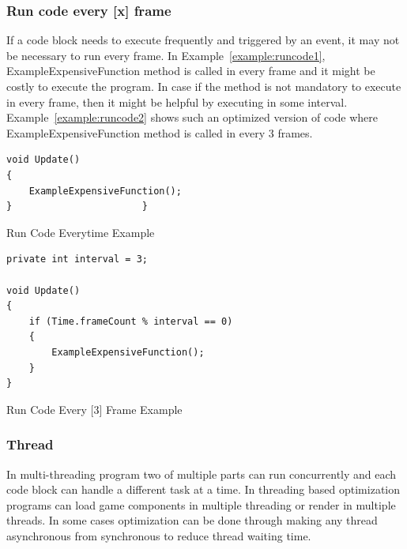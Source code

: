 \subsubsection{Run code every [x] frame}
If a code block needs to execute frequently and triggered by an event, it may not be necessary to run every frame. In Example~\ref{example:runcode1}, ExampleExpensiveFunction method is called in every frame and it might be costly to execute the program. In case if the method is not mandatory to execute in every frame, then it might be helpful by executing in some interval. Example~\ref{example:runcode2} shows such an optimized version of code where ExampleExpensiveFunction method is called in every 3 frames.

\begin{example}
\begin{lstlisting}[escapechar=!]
void Update()
{
    ExampleExpensiveFunction();
}          				}
\end{lstlisting}
  \caption{Run Code Everytime Example}
  \label{example:runcode1}  
\end{example}

\begin{example}
\begin{lstlisting}[escapechar=!]
private int interval = 3;

void Update()
{
    if (Time.frameCount % interval == 0)
    {
        ExampleExpensiveFunction();
    }
}
\end{lstlisting}
  \caption{Run Code Every [3] Frame Example}
  \label{example:runcode2}  
\end{example}


\subsubsection{Thread}
In multi-threading program two of multiple parts can run concurrently and each code block can handle a different task at a time. In threading based optimization programs can load game components in multiple threading or render in multiple threads. In some cases optimization can be  done through making any thread asynchronous from synchronous to reduce thread waiting time. 
 

